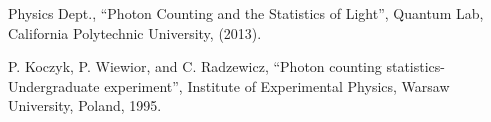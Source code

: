\begin{thebibliography}{99}

 Physics Dept., ``Photon Counting and the Statistics of Light'', Quantum Lab, California Polytechnic University, (2013).

 P. Koczyk, P. Wiewior, and C. Radzewicz, ``Photon counting statistics-Undergraduate experiment'', Institute of Experimental Physics, Warsaw University, Poland, 1995.

\end{thebibliography}


